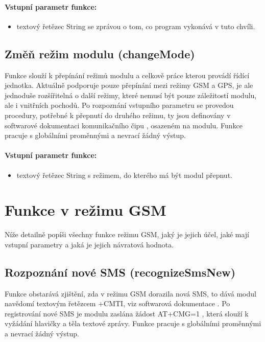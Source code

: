 \documentclass[FM,BP]{tulthesis}  %
\begin{document}
\paragraph{Vstupní parametr funkce:}
\begin{itemize}
\item textový řetězec String se zprávou o tom, co program vykonává v tuto chvíli.
\end{itemize}

\subsection{Změň režim modulu (changeMode)}
Funkce slouží k přepínání režimů modulu a celkově práce kterou provádí řídící jednotka. Aktuálně podporuje pouze přepínání mezi režimy GSM a GPS, je ale jednoduše rozšířitelná o další režimy, které nemusí být pouze záležitostí modulu, ale i vnitřních pochodů. Po rozpoznání vstupního parametru se provedou procedury, potřebné k přepnutí do druhého režimu, ty jsou definovány v softwarové dokumentaci komunikačního čipu \cite{SIMCOM SW}, osazeném na modulu. Funkce pracuje s globálními proměnnými a nevrací žádný výstup.

\paragraph{Vstupní parametr funkce:}
\begin{itemize}
\item textový řetězec String s režimem, do kterého má být modul přepnut.
\end{itemize}


\section{Funkce v režimu GSM}
Níže detailně popíši všechny funkce režimu GSM, jaký je jejich účel, jaké mají vstupní parametry a jaká je jejich návratová hodnota.

\subsection{Rozpoznání nové SMS (recognizeSmsNew)}
Funkce obstarává zjištění, zda v režimu GSM dorazila nová SMS, to dává modul navědomí textovým řetězcem +CMTI, viz softwarová dokumentace \cite{SIMCOM SW}. Po registrování nové SMS je modulu zaslána žádost AT+CMG=1 \cite{SIMCOM SW}, která slouží k vyžádání hlavičky a těla textové zprávy. Funkce pracuje s globálními proměnnými a nevrací žádný výstup.
\end{document}

